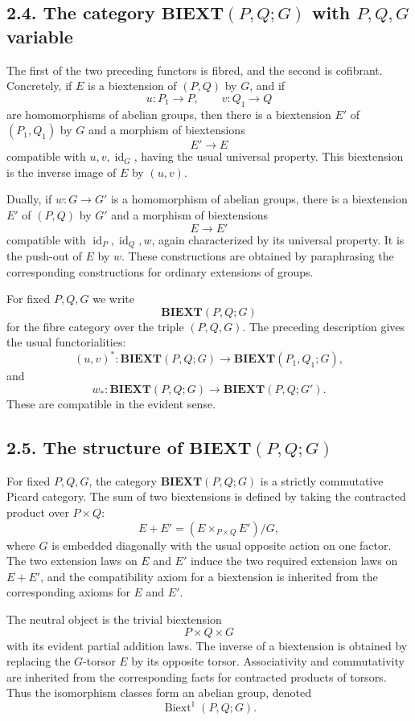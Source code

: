 \documentclass[11pt]{article}
\newcommand{\id}{\operatorname{id}}
\newcommand{\Biext}{\operatorname{Biext}}
\newcommand{\BIEXT}{\mathbf{BIEXT}}
\begin{document}
\subsection*{2.4. The category \(\BIEXT(P,Q;G)\) with \(P,Q,G\) variable}

The first of the two preceding functors is fibred, and the second is cofibrant.
Concretely, if \(E\) is a biextension of \((P,Q)\) by \(G\), and if
\[
u:P_1\to P,\qquad v:Q_1\to Q
\]
are homomorphisms of abelian groups, then there is a biextension \(E'\) of
\((P_1,Q_1)\) by \(G\) and a morphism of biextensions
\[
E'\longrightarrow E
\]
compatible with \(u,v,\id_G\), having the usual universal property. This
biextension is the inverse image of \(E\) by \((u,v)\).

Dually, if \(w:G\to G'\) is a homomorphism of abelian groups, there is a
biextension \(E'\) of \((P,Q)\) by \(G'\) and a morphism of biextensions
\[
E\longrightarrow E'
\]
compatible with \(\id_P,\id_Q,w\), again characterized by its universal property.
It is the push-out of \(E\) by \(w\). These constructions are obtained by
paraphrasing the corresponding constructions for ordinary extensions of groups.

For fixed \(P,Q,G\) we write
\[
\BIEXT(P,Q;G)
\]
for the fibre category over the triple \((P,Q,G)\). The preceding description
gives the usual functorialities:
\[
(u,v)^*:\BIEXT(P,Q;G)\to \BIEXT(P_1,Q_1;G),
\]
and
\[
w_*:\BIEXT(P,Q;G)\to \BIEXT(P,Q;G').
\]
These are compatible in the evident sense.

\subsection*{2.5. The structure of \(\BIEXT(P,Q;G)\)}

For fixed \(P,Q,G\), the category \(\BIEXT(P,Q;G)\) is a strictly commutative
Picard category. The sum of two biextensions is defined by taking the contracted
product over \(P\times Q\):
\[
E+E'=(E\times_{P\times Q}E')/G,
\]
where \(G\) is embedded diagonally with the usual opposite action on one factor.
The two extension laws on \(E\) and \(E'\) induce the two required extension laws
on \(E+E'\), and the compatibility axiom for a biextension is inherited from the
corresponding axioms for \(E\) and \(E'\).

The neutral object is the trivial biextension
\[
P\times Q\times G
\]
with its evident partial addition laws. The inverse of a biextension is obtained
by replacing the \(G\)-torsor \(E\) by its opposite torsor. Associativity and
commutativity are inherited from the corresponding facts for contracted products
of torsors. Thus the isomorphism classes form an abelian group, denoted
\[
\Biext^1(P,Q;G).
\]
\end{document}
